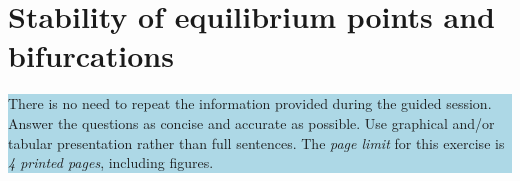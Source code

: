 
\chapter{Stability of equilibrium points and bifurcations}

\begin{center}
\colorbox{LightBlue}{\parbox{1\textwidth}{ There is no need to repeat the information provided during the guided session. Answer the questions as concise and accurate as possible. Use graphical and/or tabular presentation rather than full sentences. The \textit{page limit} 
for this exercise is \textit{4 printed pages}, including figures.}}
\end{center}










